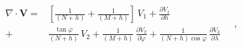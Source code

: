 \documentclass[mreferee]{gji}
\begin{document}

\begin{equation} \label{eq:divergent-geodetic}
\begin{split}
\nabla \cdot \mathbf{V} =
& \left[ \frac{1}{\left( N + h \right)} + \frac{1}{\left( M + h \right)} \right] \, V_{1} + \frac{\partial V_{1}}{\partial h} \\
+ & \frac{\tan \varphi}{\left( N + h \right)} \, V_{2} + \frac{1}{\left( M + h \right)} \, \frac{\partial V_{2}}{\partial \varphi} +
\frac{1}{\left( N + h \right) \cos\varphi} \, \frac{\partial V_{3}}{\partial \lambda}
\end{split} \quad ,
\end{equation}
\end{document}
